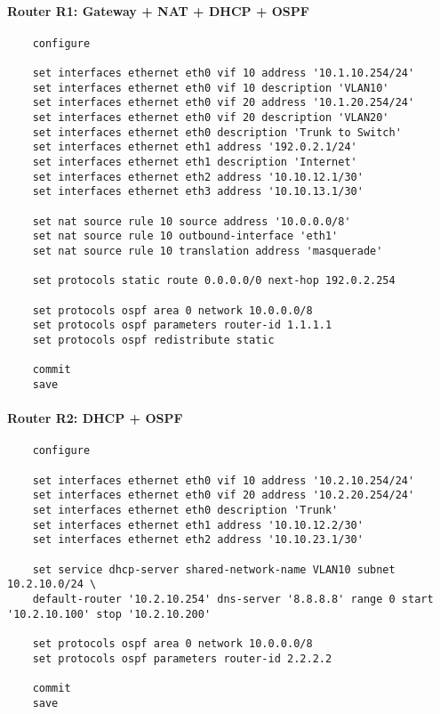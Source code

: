 \vspace{0.3cm}
\paragraph{Router R1: Gateway + NAT + DHCP + OSPF}
\begin{verbatim}
    configure
    
    set interfaces ethernet eth0 vif 10 address '10.1.10.254/24'
    set interfaces ethernet eth0 vif 10 description 'VLAN10'
    set interfaces ethernet eth0 vif 20 address '10.1.20.254/24'
    set interfaces ethernet eth0 vif 20 description 'VLAN20'
    set interfaces ethernet eth0 description 'Trunk to Switch'
    set interfaces ethernet eth1 address '192.0.2.1/24'
    set interfaces ethernet eth1 description 'Internet'
    set interfaces ethernet eth2 address '10.10.12.1/30'
    set interfaces ethernet eth3 address '10.10.13.1/30'
    
    set nat source rule 10 source address '10.0.0.0/8'
    set nat source rule 10 outbound-interface 'eth1'
    set nat source rule 10 translation address 'masquerade'
    
    set protocols static route 0.0.0.0/0 next-hop 192.0.2.254
    
    set protocols ospf area 0 network 10.0.0.0/8
    set protocols ospf parameters router-id 1.1.1.1
    set protocols ospf redistribute static
    
    commit
    save
\end{verbatim}

\vspace{0.3cm}
\paragraph{Router R2: DHCP + OSPF}
\begin{verbatim}
    configure
    
    set interfaces ethernet eth0 vif 10 address '10.2.10.254/24'
    set interfaces ethernet eth0 vif 20 address '10.2.20.254/24'
    set interfaces ethernet eth0 description 'Trunk'
    set interfaces ethernet eth1 address '10.10.12.2/30'
    set interfaces ethernet eth2 address '10.10.23.1/30'
    
    set service dhcp-server shared-network-name VLAN10 subnet 10.2.10.0/24 \
    default-router '10.2.10.254' dns-server '8.8.8.8' range 0 start '10.2.10.100' stop '10.2.10.200'
    
    set protocols ospf area 0 network 10.0.0.0/8
    set protocols ospf parameters router-id 2.2.2.2
    
    commit
    save
\end{verbatim}

